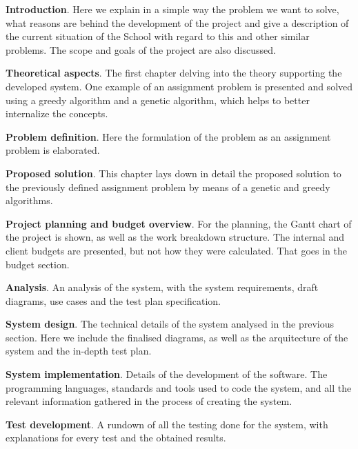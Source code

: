 \begin{description}

    \item \textbf{Introduction}. Here we explain in a simple way the problem we want to solve, what reasons are behind the development of the project and give a description of the current situation of the School with regard to this and other similar problems. The scope and goals of the project are also discussed.

    \item \textbf{Theoretical aspects}. The first chapter delving into the theory supporting the developed system. One example of an assignment problem is presented and solved using a greedy algorithm and a genetic algorithm, which helps to better internalize the concepts.

    \item \textbf{Problem definition}. Here the formulation of the problem as an assignment problem is elaborated. 

    \item \textbf{Proposed solution}. This chapter lays down in detail the proposed solution to the previously defined assignment problem by means of a genetic and greedy algorithms.

    \item \textbf{Project planning and budget overview}. For the planning, the Gantt chart of the project is shown, as well as the work breakdown structure. The internal and client budgets are presented, but not how they were calculated. That goes in the budget section.

    \item \textbf{Analysis}. An analysis of the system, with the system requirements, draft diagrams, use cases and the test plan specification. 

    \item \textbf{System design}. The technical details of the system analysed in the previous section. Here we include the finalised diagrams, as well as the arquitecture of the system and the in-depth test plan.

    \item \textbf{System implementation}. Details of the development of the software. The programming languages, standards and tools used to code the system, and all the relevant information gathered in the process of creating the system.

    \item \textbf{Test development}. A rundown of all the testing done for the system, with explanations for every test and the obtained results. 


\end{description}
